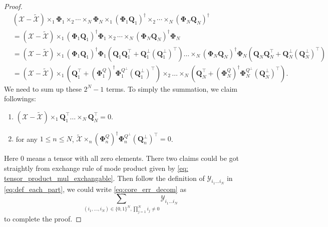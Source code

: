 \begin{proof}
\begin{equation}
\begin{aligned}
&(\mathscr{X} -  \tilde{\mathscr{X}})\times_1 \mathbf{\Phi}_1 \times_2 \cdots \times_N \mathbf{\Phi}_N  \times_1 (\mathbf{\Phi}_1 \mathbf{Q}_1)^\dag \times_2\cdots \times_N (\mathbf{\Phi}_N \mathbf{Q}_N)^\dag \\
& =(\mathscr{X} -  \tilde{\mathscr{X}})\times_1 (\mathbf{\Phi}_1\mathbf{Q}_1)^\dag \mathbf{\Phi}_1 \times_2\cdots \times_N (\mathbf{\Phi}_N\mathbf{Q}_N)^\dag \mathbf{\Phi}_N \\
& =  (\mathscr{X} -  \tilde{\mathscr{X}}) \times_1 (\mathbf{\Phi}_1\mathbf{Q}_1)^\dag \mathbf{\Phi}_1(\mathbf{Q}_1\mathbf{Q}_1^\top + \mathbf{Q}_1^\bot (\mathbf{Q}_1^\bot)^\top)\dots \times_N (\mathbf{\Phi}_N\mathbf{Q}_N)^\dag \mathbf{\Phi}_N(\mathbf{Q}_N\mathbf{Q}_N^\top + \mathbf{Q}_N^\bot (\mathbf{Q}_N^\bot)^\top)\\
& = (\mathscr{X} -  \tilde{\mathscr{X}}) \times_1 (\mathbf{Q}_1^\top + (\mathbf{\Phi}_1^Q)^\dag  \mathbf{\Phi}_1^{Q^\bot}(\mathbf{Q}_1^\bot)^\top)\times_2\dots \times_N (\mathbf{Q}_N^\top + (\mathbf{\Phi}_N^Q)^\dag  \mathbf{\Phi}_N^{Q^\bot}(\mathbf{Q}_N^\bot)^\top).
\end{aligned}
\end{equation}
We need to sum up these $2^N-1$ terms. To simply the summation, we claim followings:
\begin{enumerate}
\item $(\mathscr{X} - \tilde{\mathscr{X}})\times_1 \mathbf{Q}_1^\top\dots \times_N \mathbf{Q}_N^\top = 0$.
\item for any $1\le n\le N$, $\tilde{\mathscr{X}}\times_n (\mathbf{\Phi}_n^Q)^\dag  \mathbf{\Phi}_n^{Q^\bot}(\mathbf{Q}_n^\bot)^\top =  0$.
\end{enumerate}
Here $0$ means a tensor with all zero elements. There two claims could be got straightly from exchange rule of mode product given by \ref{eq: tensor_product_mul_exchangable}. Then follow the definition of $\mathscr{Y}_{i_1\dots i_N}$ in \eqref{eq:def_each_part},
we could write \eqref{eq:core_err_decom} as 
\begin{equation}
\sum_{(i_1,\dots, i_N) \in \{0,1\}^N, \prod_{j=1}^N i_j \neq 0} \mathscr{Y}_{i_1\dots i_N}
\end{equation}
to complete the proof.
\end{proof}
